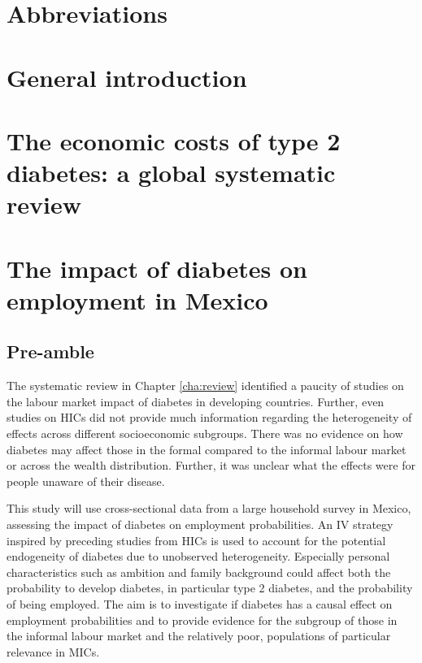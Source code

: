 \cleardoublepage
{}
\chapter*{\label{abbreviations}Abbreviations}


\acresetall  %



\chapter{\label{cha:intro}General introduction}

\acresetall  %
\chapter{\label{cha:review}The economic costs of type 2 diabetes: a global systematic review}

\acresetall  %
\chapter{\label{cha:Mex1}The impact of diabetes on employment in Mexico}
\section*{Pre-amble}

The systematic review in Chapter \ref{cha:review} identified a paucity of studies on the labour market impact of diabetes in developing countries. Further, even studies on \acp{HIC} did not provide much information regarding the heterogeneity of effects across different socioeconomic subgroups. There was no evidence on how diabetes may affect those in the formal compared to the informal labour market or across the wealth distribution. Further, it was unclear what the effects were for people unaware of their disease.

This study will use cross-sectional data from a large household survey in Mexico, assessing the impact of diabetes on employment probabilities. An \ac{IV} strategy inspired by preceding studies from \acp{HIC} is used to account for the potential endogeneity of diabetes due to unobserved heterogeneity. Especially personal characteristics such as ambition and family background could affect both the probability to develop diabetes, in particular type 2 diabetes, and the probability of being employed. The aim is to investigate if diabetes has a causal effect on employment probabilities and to provide evidence for the subgroup of those in the informal labour market and the relatively poor, populations of particular relevance in \acp{MIC}.

\acresetall  %

